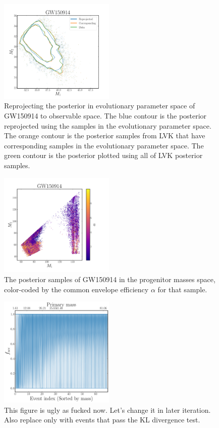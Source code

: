 \documentclass[twocolumn]{aastex631}
\begin{document}
\begin{figure}
\includegraphics[width=0.49\textwidth]{static/GW150914_reprojection.pdf}
\caption{Reprojecting the posterior in evolutionary parameter space of GW150914 to observable space.
The blue contour is the posterior reprojected using the samples in the evolutionary parameter space.
The orange contour is the posterior samples from LVK that have corresponding samples in the evolutionary parameter space.
The green contour is the posterior plotted using all of LVK posterior samples.
}
\label{fig:GW150914_reprojection}
\end{figure}

\begin{figure}
\includegraphics[width=0.49\textwidth]{static/GW150914_m1m2alpha.png}
\caption{The posterior samples of GW150914 in the progenitor masses space, color-coded by the common envelope efficiency $\alpha$ for that sample.}
\label{fig:GW150914_m1_m2_alpha}
\end{figure}

\begin{figure}
\includegraphics[width=0.49\textwidth]{static/GWTC3_alpha_mass.pdf}
\caption{This figure is ugly as fucked now. Let's change it in later iteration.
Also replace only with events that pass the KL divergence test.}
\label{fig:GWTC3_alpha_mass}
\end{figure}
\end{document}
